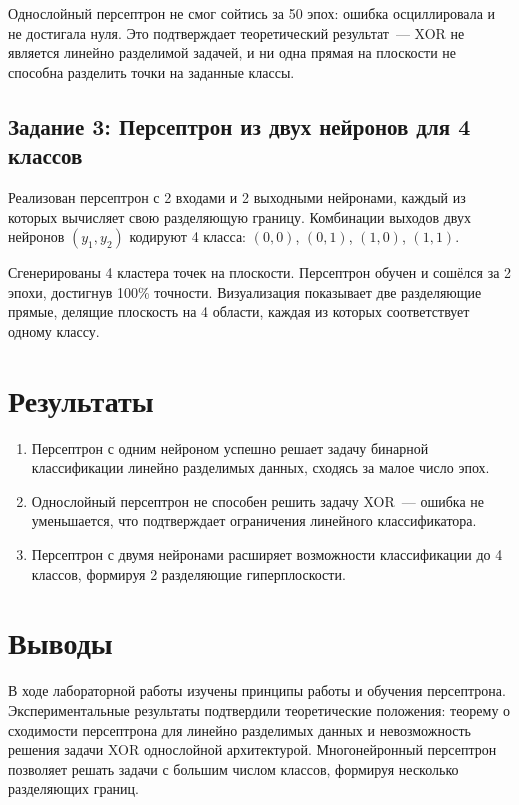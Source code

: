 \documentclass[14pt,a4paper]{extarticle}
\begin{document}
Однослойный персептрон не смог сойтись за 50 эпох: ошибка осциллировала и не достигала нуля. Это подтверждает теоретический результат~--- XOR не является линейно разделимой задачей, и ни одна прямая на плоскости не способна разделить точки на заданные классы.

\subsection{Задание 3: Персептрон из двух нейронов для 4 классов}

Реализован персептрон с 2 входами и 2 выходными нейронами, каждый из которых вычисляет свою разделяющую границу. Комбинации выходов двух нейронов $(y_1, y_2)$ кодируют 4 класса: $(0,0)$, $(0,1)$, $(1,0)$, $(1,1)$.

Сгенерированы 4 кластера точек на плоскости. Персептрон обучен и сошёлся за 2 эпохи, достигнув 100\% точности. Визуализация показывает две разделяющие прямые, делящие плоскость на 4 области, каждая из которых соответствует одному классу.

\section{Результаты}

\begin{enumerate}
\item Персептрон с одним нейроном успешно решает задачу бинарной классификации линейно разделимых данных, сходясь за малое число эпох.
\item Однослойный персептрон не способен решить задачу XOR~--- ошибка не уменьшается, что подтверждает ограничения линейного классификатора.
\item Персептрон с двумя нейронами расширяет возможности классификации до 4 классов, формируя 2 разделяющие гиперплоскости.
\end{enumerate}

\section{Выводы}

В ходе лабораторной работы изучены принципы работы и обучения персептрона. Экспериментальные результаты подтвердили теоретические положения: теорему о сходимости персептрона для линейно разделимых данных и невозможность решения задачи XOR однослойной архитектурой. Многонейронный персептрон позволяет решать задачи с большим числом классов, формируя несколько разделяющих границ.
\end{document}
